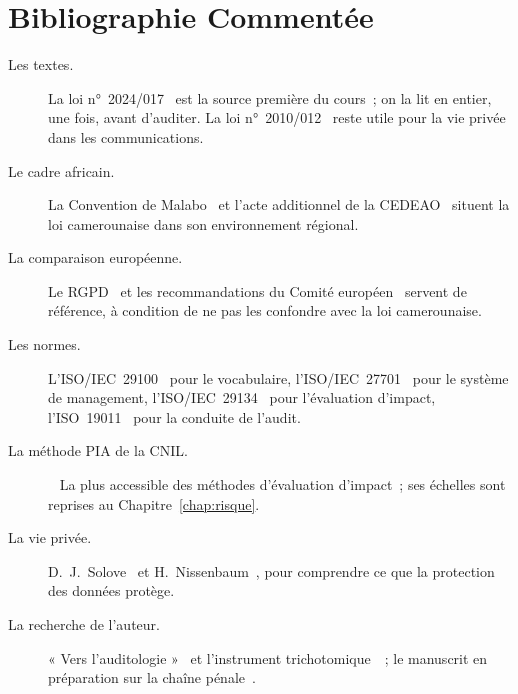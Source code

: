 
\chapter{Bibliographie Commentée}
\label{ann:bibliographie}

\begin{description}
    \item[Les textes.] La loi n°~2024/017~\cite{loi2024017} est la source
          première du cours~; on la lit en entier, une fois, avant
          d'auditer. La loi n°~2010/012~\cite{loi2010012} reste utile pour
          la vie privée dans les communications.
    \item[Le cadre africain.] La Convention de Malabo~\cite{ua2014malabo}
          et l'acte additionnel de la CEDEAO~\cite{cedeao2010acte} situent
          la loi camerounaise dans son environnement régional.
    \item[La comparaison européenne.] Le RGPD~\cite{ue2016rgpd} et les
          recommandations du Comité européen~\cite{edpb2020transferts}
          servent de référence, à condition de ne pas les confondre avec la
          loi camerounaise.
    \item[Les normes.] L'ISO/IEC~29100~\cite{iso29100} pour le vocabulaire,
          l'ISO/IEC~27701~\cite{iso27701} pour le système de management,
          l'ISO/IEC~29134~\cite{iso29134} pour l'évaluation d'impact,
          l'ISO~19011~\cite{iso19011_2018} pour la conduite de l'audit.
    \item[La méthode PIA de la CNIL.]~\cite{cnil2018pia} La plus accessible
          des méthodes d'évaluation d'impact~; ses échelles sont reprises au
          Chapitre~\ref{chap:risque}.
    \item[La vie privée.] D.~J.~Solove~\cite{solove2008} et
          H.~Nissenbaum~\cite{nissenbaum2010}, pour comprendre ce que la
          protection des données protège.
    \item[La recherche de l'auteur.] « Vers l'auditologie »~\cite{minka2026auditologie}
          et l'instrument trichotomique~\cite{minka2026nek}~; le manuscrit
          en préparation sur la chaîne pénale~\cite{minka2026chainepenale}.
\end{description}
